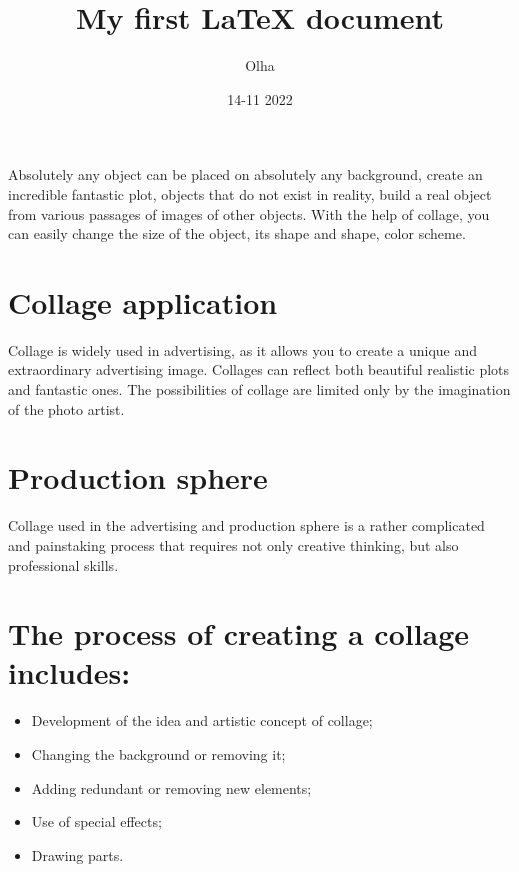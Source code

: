 \documentclass{article}
\title{My first LaTeX document}	\author{Olha}
\date{14-11 2022}
\begin{document}
	\maketitle
	\newpage
Absolutely any object can be placed on absolutely any background, create an incredible fantastic plot, objects that do not exist in reality, build a real object from various passages of images of other objects. With the help of collage, you can easily change the size of the object, its shape and shape, color scheme.

\section*{Collage application} 


Collage is widely used in advertising, as it allows you to create a unique and extraordinary advertising image. Collages can reflect both beautiful realistic plots and fantastic ones. The possibilities of collage are limited only by the imagination of the photo artist.

\section {Production sphere}

Collage used in the advertising and production sphere is a rather complicated and painstaking process that requires not only creative thinking, but also professional skills.
\section {The process of creating a collage includes:}
\begin{itemize}
	\item Development of the idea and artistic concept of collage;
	\item Changing the background or removing it;
	\item Adding redundant or removing new elements;
	\item Use of special effects;
	\item Drawing parts.
\end{itemize}
\end{document}
